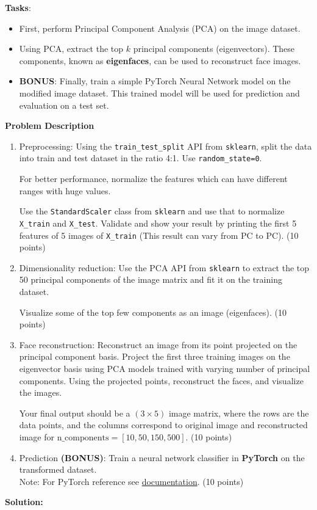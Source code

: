 \documentclass[11pt]{article}
\begin{document}
\textbf{Tasks}:
\begin{itemize}
    \item First, perform Principal Component Analysis (PCA) on the image dataset.
    \item Using PCA, extract the top $k$ principal components (eigenvectors). These components, known as \textbf{eigenfaces}, can be used to reconstruct face images.
    \item \textbf{BONUS}: Finally, train a simple PyTorch Neural Network model on the modified image dataset. This trained model will be used for prediction and evaluation on a test set.
\end{itemize}

\textbf{Problem Description}
\begin{enumerate}
    \item[(a)] Preprocessing: Using the \texttt{train\_test\_split} API from \texttt{sklearn}, split the data into train and test dataset in the ratio 4:1. Use \texttt{random\_state=0}.

    For better performance, normalize the features which can have different ranges with huge values.

    Use the \texttt{StandardScaler} class from \texttt{sklearn} and use that to normalize \texttt{X\_train} and \texttt{X\_test}. Validate and show your result by printing the first 5 features of 5 images of \texttt{X\_train} (This result can vary from PC to PC). (10 points)

    \item[(b)] Dimensionality reduction: Use the PCA API from \texttt{sklearn} to extract the top 50 principal components of the image matrix and fit it on the training dataset.

    Visualize some of the top few components as an image (eigenfaces). (10 points)

    \item[(c)] Face reconstruction: Reconstruct an image from its point projected on the principal component basis. Project the first three training images on the eigenvector basis using PCA models trained with varying number of principal components. Using the projected points, reconstruct the faces, and visualize the images.

    Your final output should be a $(3\times 5)$ image matrix, where the rows are the data points, and the columns correspond to original image and reconstructed image for $\text{n\_components} =[10,50,150,500]$. (10 points)

    \item[(d)] Prediction \textbf{(BONUS)}: Train a neural network classifier in \textbf{PyTorch} on the transformed dataset.\\
    Note: For PyTorch reference see \href{https://pytorch.org/docs/stable/index.html}{documentation}. (10 points)
\end{enumerate}

\textbf{Solution:}

\bigskip
\end{document}
